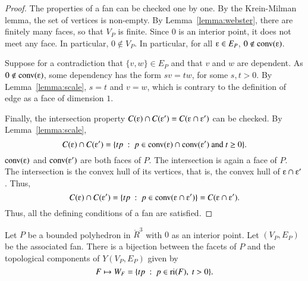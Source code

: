 \begin{proof} The properties of a fan can be checked one by one.
By the Krein-Milman lemma, the set of vertices is non-empty.  By Lemma~\ref{lemma:webster}, there are finitely many faces, so that $V_P$ is finite.  Since $0$ is an interior point, it does not meet any face.  In particular, $0\not\in V_P$.   In particular,
for all $\e\in E_P$, 
$0\not\in \op{conv}(\e)$.

Suppose for a contradiction that $\{v,w\}\in E_P$ and that $v$ and $w$ are dependent.  As $0\not\in \op{conv}(\e)$, some dependency has the form $s v = t w$, for some $s, t>0$.  By Lemma~\ref{lemma:scale}, $s=t$ and $v=w$, which is contrary to the definition of edge as a face of dimension $1$.

Finally, the intersection property $C(\e)\cap C(\e') = C(\e \cap \e')$ can be checked.
By Lemma~\ref{lemma:scale},
$$
C(\e) \cap C(\e') = \{t p \mid p\in \op{conv}(\e) \cap \op{conv}(\e') \text{ and } t \ge 0\}.
$$
$\op{conv}(\e)$ and $\op{conv}(\e')$ are both faces of $P$.  The intersection is again a face of $P$.  The intersection is the convex hull of its vertices, that is, the convex hull of $\e \cap \e'$.  Thus,
$$
C(\e)\cap C(\e') = \{t p \mid p\in \op{conv}(\e\cap \e')\} = C(\e \cap \e').
$$
Thus, all the defining conditions of a fan are satisfied.
\end{proof}


\begin{lemma} Let $P$ be a bounded polyhedron in $\ring{R}^3$ with $0$ as an interior point.  Let $(V_P,E_P)$ be the associated fan.  There is a bijection between the facets of $P$ and the topological components of $Y(V_P,E_P)$ given by 
$$
F \mapsto W_F = \{t p \ :\  p\in {\operatorname{ri}}(F),~t >0\}.
$$
\end{lemma}

